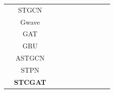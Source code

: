 \documentclass[12pt,a4paper]{report}
\begin{document}
\begin{table}[h]
\begin{tabular}{ccccccccccc}
                                          & STGCN           &                              &                            & \multicolumn{1}{c|}{}               &              &               & \multicolumn{1}{c|}{}              &              &               &               \\
                                          & Gwave           &                              &                            & \multicolumn{1}{c|}{}               &              &               & \multicolumn{1}{c|}{}              &              &               &               \\
                                          & GAT             &                              &                            & \multicolumn{1}{c|}{}               &              &               & \multicolumn{1}{c|}{}              &              &               &               \\
                                          & GRU             &                              &                            & \multicolumn{1}{c|}{}               &              &               & \multicolumn{1}{c|}{}              &              &               &               \\
                                          & ASTGCN          &                              &                            & \multicolumn{1}{c|}{}               &              &               & \multicolumn{1}{c|}{}              &              &               &               \\
                                          & STPN            &                              &                            & \multicolumn{1}{c|}{}               &              &               & \multicolumn{1}{c|}{}              &              &               &               \\
                                          & \textbf{STCGAT} &                              &                            & \multicolumn{1}{c|}{}               &              &               & \multicolumn{1}{c|}{}              &              &               &               \\ \bottomrule
    \end{tabular}
\end{table}
\end{document}
